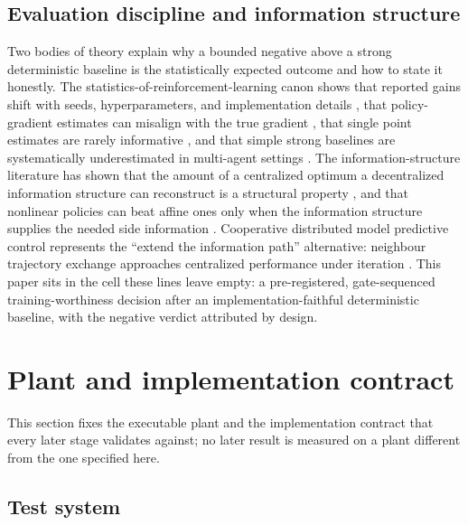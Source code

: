 \documentclass[journal]{IEEEtran}
\begin{document}
\subsection{Evaluation discipline and information structure}
Two bodies of theory explain why a bounded negative above a strong deterministic baseline is the statistically expected outcome and how to state it honestly. The statistics-of-reinforcement-learning canon shows that reported gains shift with seeds, hyperparameters, and implementation details \cite{henderson2018deep,engstrom2020implementation}, that policy-gradient estimates can misalign with the true gradient \cite{ilyas2020closer}, that single point estimates are rarely informative \cite{agarwal2021deep}, and that simple strong baselines are systematically underestimated in multi-agent settings \cite{yu2022surprising}. The information-structure literature has shown that the amount of a centralized optimum a decentralized information structure can reconstruct is a structural property \cite{dobbe2017fully,ho1980team}, and that nonlinear policies can beat affine ones only when the information structure supplies the needed side information \cite{mehmetoglu2014deterministic,baglietto2001numerical}. Cooperative distributed model predictive control represents the ``extend the information path'' alternative: neighbour trajectory exchange approaches centralized performance under iteration \cite{stewart2010cooperative,conte2016distributed,lin2024power}. This paper sits in the cell these lines leave empty: a pre-registered, gate-sequenced training-worthiness decision after an implementation-faithful deterministic baseline, with the negative verdict attributed by design.

\section{Plant and implementation contract}
\label{sec:plant}

This section fixes the executable plant and the implementation contract that every later stage validates against; no later result is measured on a plant different from the one specified here.

\subsection{Test system}
\label{sec:test-system}
\end{document}
